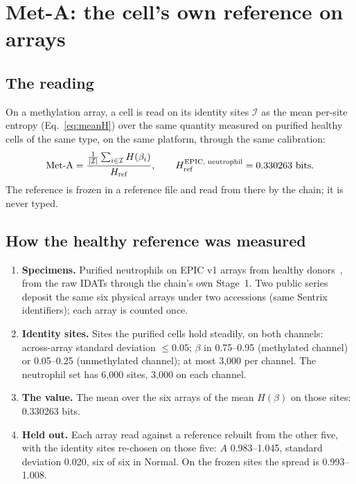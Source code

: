 \chapter{Met-A: the cell's own reference on arrays}\label{ch:meta}

\section{The reading}

On a methylation array, a cell is read on its identity sites $\mathcal I$ as the mean per-site entropy (Eq.~\eqref{eq:meanH})
over the same quantity measured on purified healthy cells of the same type, on the same platform, through the same
calibration:
\begin{equation}
  \text{Met-A}=\frac{\frac{1}{|\mathcal I|}\sum_{i\in\mathcal I}H(\beta_i)}{H_{\rm ref}},
  \qquad H_{\rm ref}^{\text{EPIC, neutrophil}}=0.330263\ \text{bits}.
  \label{eq:meta}
\end{equation}
\calibrated{} The reference is frozen in a reference file and read from
there by the chain; it is never typed.

\section{How the healthy reference was measured}

\begin{enumerate}
\item \textbf{Specimens.} Purified neutrophils on EPIC v1 arrays from healthy donors~\cite{Salas2018,Salas2022}, from the raw
      IDATs through the chain's own Stage~1. Two public series deposit the same six physical arrays under two accessions
      (same Sentrix identifiers); each array is counted once.
\item \textbf{Identity sites.} Sites the purified cells hold steadily, on both channels: across-array standard deviation
      $\le0.05$; $\beta$ in 0.75--0.95 (methylated channel) or 0.05--0.25 (unmethylated channel); at most 3,000 per channel.
      The neutrophil set has 6,000 sites, 3,000 on each channel.
\item \textbf{The value.} The mean over the six arrays of the mean $H(\beta)$ on those sites: 0.330263 bits.
\item \textbf{Held out.} Each array read against a reference rebuilt from the other five, with the identity sites re-chosen
      on those five: $A$ 0.983--1.045, standard deviation 0.020, six of six in Normal. On the frozen sites the spread is
      0.993--1.008. \measured
\end{enumerate}

